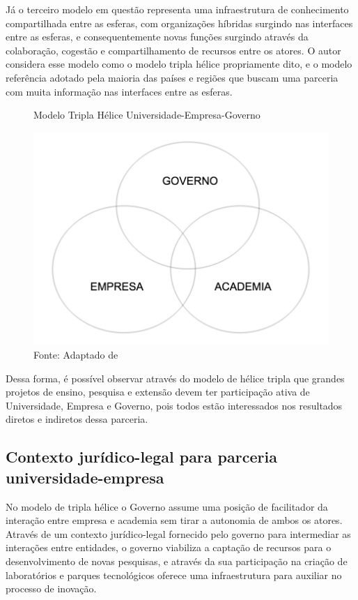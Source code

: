 Já o terceiro modelo em questão representa uma infraestrutura de conhecimento compartilhada entre as esferas, com organizações híbridas surgindo nas interfaces entre as esferas, e consequentemente novas funções surgindo através da colaboração, cogestão e compartilhamento de recursos entre os atores. O autor considera esse modelo como o modelo tripla hélice propriamente dito, e o modelo referência adotado pela maioria das países e regiões que buscam uma parceria com muita informação nas interfaces entre as esferas. 


\begin{figure}[H]
\caption{Modelo Tripla Hélice Universidade-Empresa-Governo}
\centerline{\includegraphics[scale=0.5]{img/triplehelix3}}
\label{fig:triplehelix3}
\caption* {Fonte: Adaptado de }
\end{figure}

Dessa forma, é possível observar através do modelo de hélice tripla que grandes projetos de ensino, pesquisa e extensão devem ter participação ativa de Universidade, Empresa e Governo, pois todos estão interessados nos resultados diretos e indiretos dessa parceria.

\subsection{Contexto jurídico-legal para parceria universidade-empresa}
\label{cha:juridico_legal}

No modelo de tripla hélice o Governo assume uma posição de facilitador da interação entre empresa e academia sem tirar a autonomia de ambos os atores. Através de um contexto jurídico-legal fornecido pelo governo para intermediar as interações entre entidades, o governo viabiliza a captação de recursos para o desenvolvimento de novas pesquisas, e através da sua participação na criação de laboratórios e parques tecnológicos oferece uma infraestrutura para  auxiliar no processo de inovação.

